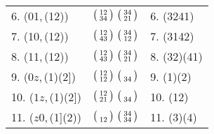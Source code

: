 \documentclass{surv-l}
\numberwithin{equation}{section}
\numberwithin{table}{section}
\numberwithin{figure}{section}
\theoremstyle{plain}
\theoremstyle{definition}
\begin{document}
\begin{table}
{\begin{tabular}{@{}|l|c|l|@{}}
6. (01,\,(12)) &$\big(\kern0.5pt\begin{smallmatrix}12 \\ 34\end{smallmatrix}\kern0.5pt\big)\ \big(\kern0.5pt\begin{smallmatrix}34 \\ 21\end{smallmatrix}\kern0.5pt\big)$ &6. (3241) \\[3pt]
7. (10,\,(12)) &$\big(\kern0.5pt\begin{smallmatrix}12 \\ 43\end{smallmatrix}\kern0.5pt\big)\ \big(\kern0.5pt\begin{smallmatrix}34 \\ 12\end{smallmatrix}\kern0.5pt\big)$ &7. (3142) \\[3pt]
8. (11,\,(12)) &$\big(\kern0.5pt\begin{smallmatrix}12 \\ 43\end{smallmatrix}\kern0.5pt\big)\ \big(\kern0.5pt\begin{smallmatrix}34 \\ 21\end{smallmatrix}\kern0.5pt\big)$ &8. (32)(41) \\[3pt]
\hline
9. ($0z$,\,(1)(2]) &$\big(\kern0.5pt\begin{smallmatrix}12 \\ 12\end{smallmatrix}\kern0.5pt\big)\ \big(\kern0.5pt\begin{smallmatrix}\vphantom{34}\\ 34\end{smallmatrix}\kern0.5pt\big)$ &9. (1)(2) \\[3pt]
10. ($1z$,\,(1)(2]) &$\big(\kern0.5pt\begin{smallmatrix}12 \\ 21\end{smallmatrix}\kern0.5pt\big)\ \big(\kern0.5pt\begin{smallmatrix}\vphantom{34}\\ 34\end{smallmatrix}\kern0.5pt\big)$ &10. (12) \\[3pt]
11. ($z0$,\,(1](2)) &$\big(\kern0.5pt\begin{smallmatrix}\vphantom{34}\\ 12\end{smallmatrix}\kern0.5pt\big)\ \big(\kern0.5pt\begin{smallmatrix}34 \\ 34\end{smallmatrix}\kern0.5pt\big)$ &11. (3)(4) \\[3pt]

\end{tabular}}
\end{table}
\end{document}
